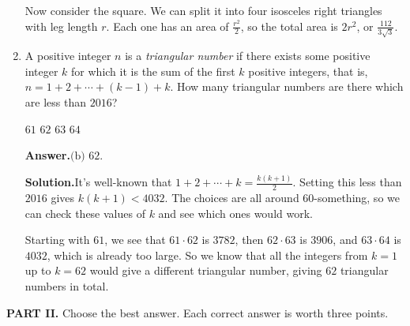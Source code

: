 \documentclass[11pt,paper=letter]{scrartcl}
\newcommand{\ans}{{\sffamily \bfseries Answer.}\;}
\newcommand{\ansb}[2]{\ans\(\boxed{\text{(#1) #2}}\).}
\newcommand{\sol}{{\sffamily \bfseries Solution.}\;}
\begin{document}
\begin{enumerate}[left=0pt]
Now consider the square. We can split it into four isosceles right triangles with leg length $r$. Each one has an area of $\frac{r^2}{2}$, so the total area is $2r^2$, or $\frac{112}{3\sqrt3}$.

\item A positive integer $n$ is a \textit{triangular number} if there exists some positive integer $k$ for which it is the sum of the first $k$ positive integers, that is, $n = 1 + 2 + \cdots + (k - 1) + k$. How many triangular numbers are there which are less than $2016$?

\fourch
{$61$}
{$62$}
{$63$}
{$64$}

\ansb{b}{$62$}

\sol It's well-known that $1 + 2 + \cdots + k = \frac{k(k+1)}{2}$. Setting this less than $2016$ gives $k(k+1) < 4032$. The choices are all around $60$-something, so we can check these values of $k$ and see which ones would work.

Starting with $61$, we see that $61 \cdot 62$ is $3782$, then $62 \cdot 63$ is $3906$, and $63 \cdot 64$ is $4032$, which is already too large. So we know that all the integers from $k = 1$ up to $k = 62$ would give a different triangular number, giving $62$ triangular numbers in total.

\end{enumerate}

\noindent\textbf{PART II.} Choose the best answer. Each correct answer is worth three points.
\end{document}
